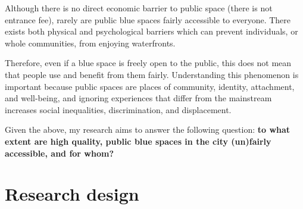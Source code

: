 \documentclass{article}
\newcommand{\bisection}[1]{\textbf{\textit{#1}}}
\begin{document}
Although there is no direct economic barrier to public space (there is not entrance fee), rarely are public blue spaces fairly accessible to everyone. There exists both physical and psychological barriers which can prevent individuals, or whole communities, from enjoying waterfronts.

Therefore, even if a blue space is freely open to the public, this does not mean that people use and benefit from them fairly. Understanding this phenomenon is important because public spaces are places of community, identity, attachment, and well-being, and ignoring experiences that differ from the mainstream increases social inequalities, discrimination, and displacement.

Given the above, my research aims to answer the following question: \textbf{to what extent are high quality, public blue spaces in the city (un)fairly accessible, and for whom?}





\section{Research design}
\end{document}
